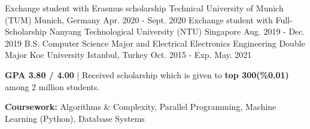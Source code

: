 \begin{cventries}

\cventry
    {Exchange student with Erasmus scholarship }
    {Technical University of Munich (TUM)} %
    {Munich, Germany} %
    {Apr. 2020 - Sept. 2020} %
    {}
\vspace{-4mm}
\cventry
    {Exchange student with Full-Scholarship}
    {Nanyang Technological University (NTU)} %
    {Singapore} %
    {Aug. 2019 - Dec. 2019} %
    {}
\vspace{-4mm}
  \cventry
    {B.S. Computer Science Major and Electrical Electronics Engineering Double Major} %
    {Koc University } %
    {Istanbul, Turkey} %
    {Oct. 2015 - Exp. May. 2021} %
    {
      \begin{cvitems} %
        \item {\textbf{GPA 3.80 / 4.00} | Received scholarship which is given to \textbf{top 300(\%0.01)} among 2 million students.}
        \item {\textbf{Coursework:} Algorithms \& Complexity, Parallel Programming, Machine Learning (Python), Database Systems}
      \end{cvitems}
    } 
\vspace{2mm}    
\end{cventries}
